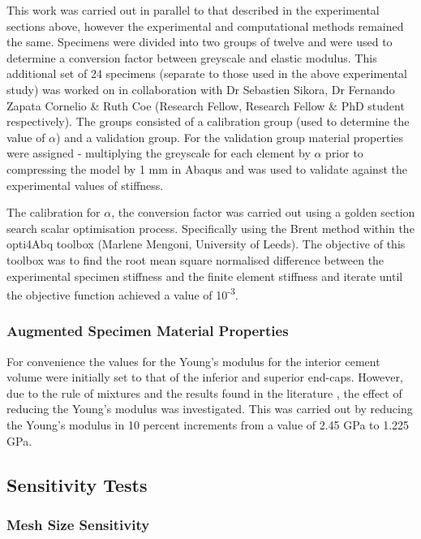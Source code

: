 This work was carried out in parallel to that described in the experimental sections above, however the experimental and computational methods remained the same. Specimens were divided into two groups of twelve  and were used to determine a conversion factor between greyscale and elastic modulus. This additional set of 24 specimens (separate to
those used in the above experimental study) was worked on in collaboration with Dr Sebastien Sikora, Dr Fernando Zapata Cornelio \& Ruth Coe (Research Fellow, Research Fellow \& PhD student respectively).
The groups consisted of a calibration group (used to determine the value of $\alpha$) and a validation group. For the validation group material properties were assigned - multiplying the greyscale
for each element by \(\alpha\) prior to compressing the model by 1 mm in
Abaqus and was used to validate against the experimental values of stiffness.

The calibration for \(\alpha\), the conversion factor was carried out
using a golden section search scalar optimisation process. Specifically
using the Brent method within the opti4Abq toolbox (Marlene Mengoni, University of Leeds). The objective of this toolbox was to find the root mean
square normalised difference between the experimental specimen stiffness
and the finite element stiffness and iterate until the objective
function achieved a value of 10\textsuperscript{-3}.

\subsubsection{Augmented Specimen Material
Properties}\label{augmented-specimen-material-properties}


For convenience the values for the Young's modulus for the interior cement volume were initially set to that of the inferior and superior end-caps. However, due to the rule of mixtures and the results found in the literature \cite{Kinzl2012a,Race2007}, the effect of reducing the Young's modulus was investigated. This was carried out by reducing the Young's modulus in 10 percent increments from a value of 2.45 GPa to 1.225 GPa.


\subsection{Sensitivity Tests}\label{sensitivity-tests}

\subsubsection{Mesh Size Sensitivity}\label{mesh-size-sensitivity}

